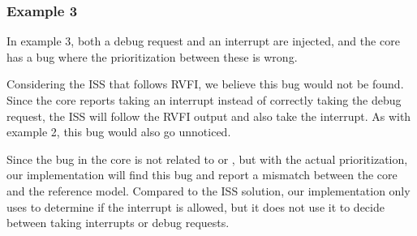 \subsubsection{Example 3}

In example 3, both a debug request and an interrupt are injected, and the core has a bug where the prioritization between these is wrong. 

Considering the ISS that follows RVFI, we believe this bug would not be found. Since the core reports taking an interrupt instead of correctly taking the debug request, the ISS will follow the RVFI output and also take the interrupt. As with example 2, this bug would also go unnoticed. 

Since the bug in the core is not related to  or \mbox{,} but with the actual prioritization, our implementation will find this bug and report a mismatch between the core and the reference model. Compared to the ISS solution, our implementation only uses  to determine if the interrupt is allowed, but it does not use it to decide between taking interrupts or debug requests.


%
%


